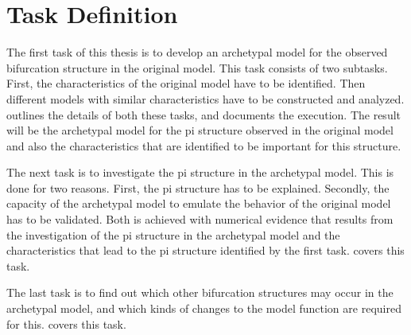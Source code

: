 \chapter{Task Definition}
\label{chap:task}

The first task of this thesis is to develop an archetypal model for the observed bifurcation structure in the original model.
This task consists of two subtasks.
First, the characteristics of the original model have to be identified.
Then different models with similar characteristics have to be constructed and analyzed.
 outlines the details of both these tasks, and  documents the execution.
The result will be the archetypal model for the \gls{pi} structure observed in the original model and also the characteristics that are identified to be important for this structure.

The next task is to investigate the \gls{pi} structure in the archetypal model.
This is done for two reasons.
First, the \gls{pi} structure has to be explained.
Secondly, the capacity of the archetypal model to emulate the behavior of the original model has to be validated.
Both is achieved with numerical evidence that results from the investigation of the \gls{pi} structure in the archetypal model and the characteristics that lead to the \gls{pi} structure identified by the first task.
 covers this task.

The last task is to find out which other bifurcation structures may occur in the archetypal model, and which kinds of changes to the model function are required for this.
 covers this task.
